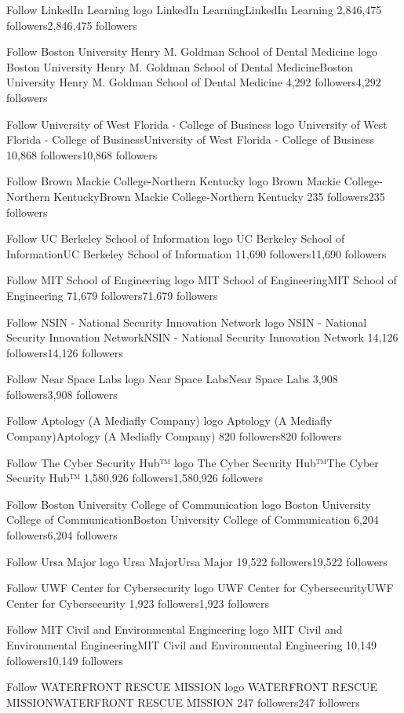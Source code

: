 Follow
LinkedIn Learning logo
LinkedIn LearningLinkedIn Learning
2,846,475 followers2,846,475 followers

Follow
Boston University Henry M. Goldman School of Dental Medicine logo
Boston University Henry M. Goldman School of Dental MedicineBoston University Henry M. Goldman School of Dental Medicine
4,292 followers4,292 followers

Follow
University of West Florida - College of Business logo
University of West Florida - College of BusinessUniversity of West Florida - College of Business
10,868 followers10,868 followers

Follow
Brown Mackie College-Northern Kentucky logo
Brown Mackie College-Northern KentuckyBrown Mackie College-Northern Kentucky
235 followers235 followers

Follow
UC Berkeley School of Information logo
UC Berkeley School of InformationUC Berkeley School of Information
11,690 followers11,690 followers

Follow
MIT School of Engineering logo
MIT School of EngineeringMIT School of Engineering
71,679 followers71,679 followers

Follow
NSIN - National Security Innovation Network logo
NSIN - National Security Innovation NetworkNSIN - National Security Innovation Network
14,126 followers14,126 followers

Follow
Near Space Labs logo
Near Space LabsNear Space Labs
3,908 followers3,908 followers

Follow
Aptology (A Mediafly Company) logo
Aptology (A Mediafly Company)Aptology (A Mediafly Company)
820 followers820 followers

Follow
The Cyber Security Hub™ logo
The Cyber Security Hub™The Cyber Security Hub™
1,580,926 followers1,580,926 followers

Follow
Boston University College of Communication logo
Boston University College of CommunicationBoston University College of Communication
6,204 followers6,204 followers

Follow
Ursa Major logo
Ursa MajorUrsa Major
19,522 followers19,522 followers

Follow
UWF Center for Cybersecurity logo
UWF Center for CybersecurityUWF Center for Cybersecurity
1,923 followers1,923 followers

Follow
MIT Civil and Environmental Engineering logo
MIT Civil and Environmental EngineeringMIT Civil and Environmental Engineering
10,149 followers10,149 followers

Follow
WATERFRONT RESCUE MISSION logo
WATERFRONT RESCUE MISSIONWATERFRONT RESCUE MISSION
247 followers247 followers

